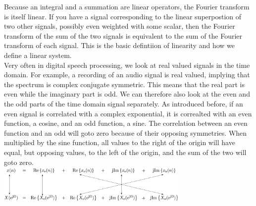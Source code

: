  Because an integral and a summation are linear operators, the Fourier transform is itself linear. If you have a signal corresponding to the linear superpostion of two other signals, possibly even weighted with some scalar, then the Fourier transform of the sum of the two signals is equivalent to the sum of the Fourier transform of each signal. This is the basic defintiion of linearity and how we define a linear system. \\
  
 Very often in digital speech processing, we look at real valued signals in the time domain.  For example, a recording of an audio signal is real valued, implying that the spectrum is complex conjugate symmetric. This means that the real part is even while the imaginary part is odd. We can therefore also look at the even and the odd parts of the time domain signal separately. As introduced before, if  an even signal is correlated with a complex exponential, it is correalted with an even function, a cosine, and an odd function, a sine. The correlation between an even function and an odd will goto zero because of their opposing symmetries. When multiplied by the sine function, all values to the right of the origin will have equal, but opposing values, to the left of the origin, and the sum of the two will goto zero. \\
 
% 
 


    \includegraphics[width=0.7\textwidth]{Pictures/Chapter3_Lesson_1/dftSymmetry2-eps-converted-to.pdf}
   
